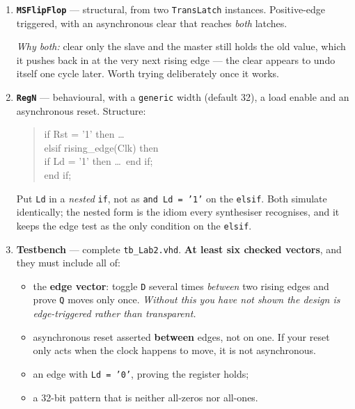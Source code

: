 \documentclass[11pt]{article}
\newcommand{\code}[1]{\texttt{#1}}
\begin{document}
\begin{enumerate}[leftmargin=2em,itemsep=3pt]
\item \textbf{\code{MSFlipFlop}} --- structural, from two \code{TransLatch}
instances. Positive-edge triggered, with an asynchronous clear that reaches
\emph{both} latches.

\emph{Why both:} clear only the slave and the master still holds the old value,
which it pushes back in at the very next rising edge --- the clear appears to
undo itself one cycle later. Worth trying deliberately once it works.

\item \textbf{\code{RegN}} --- behavioural, with a \code{generic} width
(default 32), a load enable and an asynchronous reset. Structure:

\begin{quote}\ttfamily\small
if Rst = '1' then \dots\\
elsif rising\_edge(Clk) then\\
\hspace*{1em}if Ld = '1' then \dots\ end if;\\
end if;
\end{quote}

Put \code{Ld} in a \emph{nested} \code{if}, not as \code{and Ld = '1'} on the
\code{elsif}. Both simulate identically; the nested form is the idiom every
synthesiser recognises, and it keeps the edge test as the only condition on the
\code{elsif}.

\item \textbf{Testbench} --- complete \code{tb\_Lab2.vhd}. \textbf{At least six
checked vectors}, and they must include all of:
\begin{itemize}[leftmargin=1.4em,itemsep=1pt]
\item the \textbf{edge vector}: toggle \code{D} several times \emph{between} two
rising edges and prove \code{Q} moves only once. \emph{Without this you have not
shown the design is edge-triggered rather than transparent.}
\item asynchronous reset asserted \textbf{between} edges, not on one. If your
reset only acts when the clock happens to move, it is not asynchronous.
\item an edge with \code{Ld = '0'}, proving the register holds;
\item a 32-bit pattern that is neither all-zeros nor all-ones.
\end{itemize}
\end{enumerate}
\end{document}
